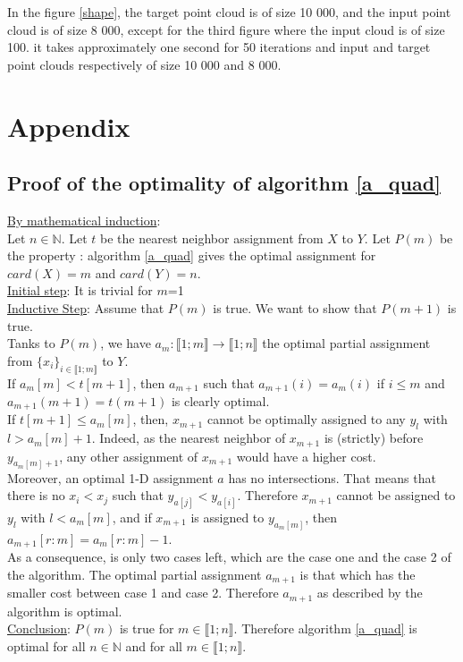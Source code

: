 \documentclass[a4paper,12pt]{article}
\begin{document}
In the figure \ref{shape}, the target point cloud is of size 10 000, and the input point cloud is of size 8 000, except for the third figure where the input cloud is of size 100. it takes approximately one second for 50 iterations and input and target point clouds respectively of size 10 000 and 8 000.

\section{Appendix}

\subsection{Proof of the optimality of algorithm \ref{a_quad}}
\label{a_quad_proof}

\noindent \underline{By mathematical induction}:\\
Let $n \in \mathbb{N}$.
Let $t$ be the nearest neighbor assignment from $X$ to $Y$.
Let $P(m)$ be the property : algorithm \ref{a_quad} gives the optimal assignment for $card(X)=m$ and $card(Y)=n$.\\
\noindent \underline{Initial step}: It is trivial for $m$=1 \\
\noindent \underline{Inductive Step}: Assume that $P(m)$ is true. We want to show that $P(m+1)$ is true. \\
\noindent Tanks to $P(m)$, we have $a_m : \llbracket 1;m \rrbracket \rightarrow \llbracket 1;n \rrbracket$ the optimal partial assignment from $\{x_i\}_{i \in \llbracket 1;m \rrbracket}$ to $Y$.\\
\noindent If $a_m[m] < t[m+1]$, then $a_{m+1}$ such that $a_{m+1}(i)=a_m(i)$ if $i \leqslant m$ and $a_{m+1}(m+1)=t(m+1)$ is clearly optimal.\\
\noindent
\noindent If $t[m+1] \leqslant a_m[m]$, then, $x_{m+1}$ cannot be optimally assigned to any $y_l$ with $l>a_m[m]+1$. Indeed, as the nearest neighbor of $x_{m+1}$ is (strictly) before $y_{a_m[m]+1}$, any other assignment of $x_{m+1}$ would have a higher cost. \\
\noindent Moreover, an optimal 1-D assignment $a$ has no intersections. That means that there is no $x_i < x_j$ such that $y_{a[j]} < y_{a[i]}$. Therefore $x_{m+1}$  cannot be assigned to $y_l$ with $l<a_m[m]$, and if $x_{m+1}$ is assigned to $y_{a_m[m]}$, then $a_{m+1}[r:m] = a_{m}[r:m]-1$.\\
\noindent As a consequence, is only two cases left, which are the case one and the case 2 of the algorithm. The optimal partial assignment $a_{m+1}$ is that which has the smaller cost between case 1 and case 2.
\noindent Therefore $a_{m+1}$ as described by the algorithm is optimal.\\
\noindent \underline{Conclusion}: $P(m)$ is true for $m \in \llbracket 1;n \rrbracket$. Therefore algorithm \ref{a_quad} is optimal for all $n \in \mathbb{N}$ and for all $m \in \llbracket 1;n \rrbracket$.
\end{document}
